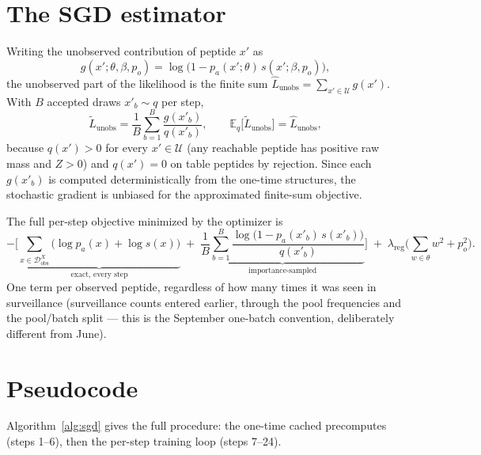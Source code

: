 \documentclass[11pt]{article}
\begin{document}
\section{The SGD estimator}\label{sec:estimator}

Writing the unobserved contribution of peptide $x'$ as
\begin{equation}
g(x'; \theta, \beta, p_o)
= \log\big(1 - p_a(x'; \theta)\, s(x'; \beta, p_o)\big),
\end{equation}
the unobserved part of the likelihood is the finite sum
$\hat{L}_{\text{unobs}} = \sum_{x' \in \mathcal{U}} g(x')$.
With $B$ accepted draws $x'_b \sim q$ per step,
\begin{equation}\label{eq:estimator}
\widetilde{L}_{\text{unobs}} = \frac{1}{B} \sum_{b=1}^{B}
\frac{g(x'_b)}{q(x'_b)},
\qquad
\mathbb{E}_q\big[\widetilde{L}_{\text{unobs}}\big]
= \hat{L}_{\text{unobs}},
\end{equation}
because $q(x') > 0$ for every $x' \in \mathcal{U}$ (any reachable peptide
has positive raw mass and $Z > 0$) and $q(x') = 0$ on table peptides by
rejection. Since each $g(x'_b)$ is computed deterministically from the
one-time structures, the stochastic gradient is unbiased for the
approximated finite-sum objective.

The full per-step objective minimized by the optimizer is
\begin{equation}\label{eq:objective}
-\Bigg[
\underbrace{\sum_{x \in \mathcal{D}^X_{\text{obs}}}
\big(\log p_a(x) + \log s(x)\big)}_{\text{exact, every step}}
\;+\;
\underbrace{\frac{1}{B}\sum_{b=1}^{B}
\frac{\log\big(1 - p_a(x'_b)\, s(x'_b)\big)}{q(x'_b)}}_{\text{importance-sampled}}
\Bigg]
\;+\;
\lambda_{\text{reg}}\Big(\sum_{w \in \theta} w^2 + p_o^2\Big).
\end{equation}
One term per observed peptide, regardless of how many times it was seen
in surveillance (surveillance counts entered earlier, through the pool
frequencies and the pool/batch split --- this is the September one-batch
convention, deliberately different from June).

\section{Pseudocode}\label{sec:pseudocode}

Algorithm~\ref{alg:sgd} gives the full procedure: the one-time cached
precomputes (steps 1--6), then the per-step training loop (steps 7--24).
\end{document}
